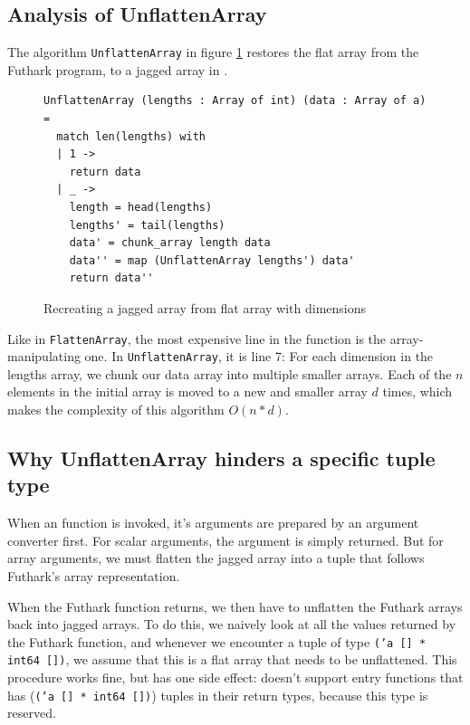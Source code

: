 \subsection{Analysis of UnflattenArray}
The algorithm \texttt{UnflattenArray} in figure \ref{fig:unflattenarray}
restores the flat array from the Futhark \csharp{} program, to a jagged array in \fsharp{}.

\begin{figure}[H]
  \centering
\begin{verbatim}
UnflattenArray (lengths : Array of int) (data : Array of a) =
  match len(lengths) with
  | 1 ->
    return data
  | _ ->
    length = head(lengths)
    lengths' = tail(lengths)
    data' = chunk_array length data 
    data'' = map (UnflattenArray lengths') data'
    return data''
\end{verbatim}
  \caption{Recreating a jagged array from flat array with dimensions}
  \label{fig:unflattenarray}
\end{figure}

Like in \texttt{FlattenArray}, the most expensive line in the function is the
array-manipulating one. In \texttt{UnflattenArray}, it is line 7: For each
dimension in the lengths array, we chunk our data array into multiple smaller
arrays. Each of the $n$ elements in the initial array is moved to a new and smaller array
$d$ times, which makes the complexity of this algorithm $O(n*d)$.

\subsection{Why UnflattenArray hinders a specific tuple type}
\label{subsec:hinderedtupletype}

When an \fshark{} function is invoked, it's arguments are prepared by an
argument converter first. For scalar arguments, the argument is simply returned.
But for array arguments, we must flatten the jagged array into a tuple that
follows Futhark's array representation.

When the Futhark function returns, we then have to unflatten the Futhark arrays
back into jagged arrays. To do this, we naively look at all the values
returned by the Futhark function, and whenever we encounter a tuple of type
\texttt{('a [] * int64 [])}, we assume that this is a flat array that needs to
be unflattened.
This procedure works fine, but has one side effect: \fshark{} doesn't support
entry functions that has (\texttt{('a [] * int64 [])}) tuples in their return
types, because this type is reserved.

